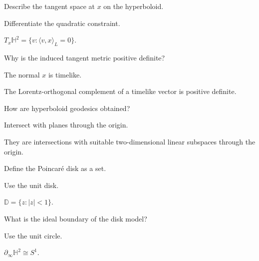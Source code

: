 \begin{exercise}\label{exr:vii31-02}
Describe the tangent space at \(x\) on the hyperboloid.
\end{exercise}
\begin{hint}
Differentiate the quadratic constraint.
\end{hint}
\begin{solution}
\(T_x\mathbb H^2=\{v:\langle v,x\rangle_L=0\}\).
\end{solution}

\begin{exercise}\label{exr:vii31-03}
Why is the induced tangent metric positive definite?
\end{exercise}
\begin{hint}
The normal \(x\) is timelike.
\end{hint}
\begin{solution}
The Lorentz-orthogonal complement of a timelike vector is positive definite.
\end{solution}

\begin{exercise}\label{exr:vii31-04}
How are hyperboloid geodesics obtained?
\end{exercise}
\begin{hint}
Intersect with planes through the origin.
\end{hint}
\begin{solution}
They are intersections with suitable two-dimensional linear subspaces through the origin.
\end{solution}

\begin{exercise}\label{exr:vii31-05}
Define the Poincaré disk as a set.
\end{exercise}
\begin{hint}
Use the unit disk.
\end{hint}
\begin{solution}
\(\mathbb D=\{z:|z|<1\}\).
\end{solution}

\begin{exercise}\label{exr:vii31-06}
What is the ideal boundary of the disk model?
\end{exercise}
\begin{hint}
Use the unit circle.
\end{hint}
\begin{solution}
\(\partial_\infty\mathbb H^2\cong S^1\).
\end{solution}

